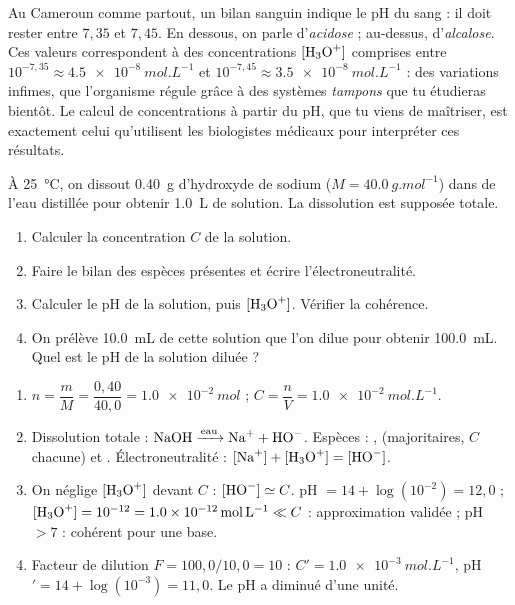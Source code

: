 \documentclass[11pt]{article}
\begin{document}
\begin{savaistu}
Au Cameroun comme partout, un bilan sanguin indique le pH du sang : il doit rester entre $7{,}35$ et $7{,}45$. En dessous, on parle d'\emph{acidose} ; au-dessus, d'\emph{alcalose}. Ces valeurs correspondent à des concentrations $[\ce{H3O+}]$ comprises entre $10^{-7{,}35} \approx \SI{4,5e-8}{mol.L^{-1}}$ et $10^{-7{,}45} \approx \SI{3,5e-8}{mol.L^{-1}}$ : des variations infimes, que l'organisme régule grâce à des systèmes \emph{tampons} que tu étudieras bientôt. Le calcul de concentrations à partir du pH, que tu viens de maîtriser, est exactement celui qu'utilisent les biologistes médicaux pour interpréter ces résultats.
\end{savaistu}

\begin{exercice}
À \SI{25}{\celsius}, on dissout \SI{0,40}{g} d'hydroxyde de sodium  ($M = \SI{40,0}{g.mol^{-1}}$) dans de l'eau distillée pour obtenir \SI{1,0}{L} de solution. La dissolution est supposée totale.
\begin{enumerate}
\item Calculer la concentration $C$ de la solution.
\item Faire le bilan des espèces présentes et écrire l'électroneutralité.
\item Calculer le pH de la solution, puis $[\ce{H3O+}]$. Vérifier la cohérence.
\item On prélève \SI{10,0}{mL} de cette solution que l'on dilue pour obtenir \SI{100,0}{mL}. Quel est le pH de la solution diluée ?
\end{enumerate}
\end{exercice}

\begin{corrige}
\begin{enumerate}
\item $n = \dfrac{m}{M} = \dfrac{0{,}40}{40{,}0} = \SI{1,0e-2}{mol}$ ; $C = \dfrac{n}{V} = \SI{1,0e-2}{mol.L^{-1}}$.
\item Dissolution totale : $\ce{NaOH ->[eau] Na+ + HO-}$. Espèces : ,  (majoritaires, $C$ chacune) et . Électroneutralité : $[\ce{Na+}] + [\ce{H3O+}] = [\ce{HO-}]$.
\item On néglige $[\ce{H3O+}]$ devant $C$ : $[\ce{HO-}] \simeq C$. pH $= 14 + \log(10^{-2}) = 12{,}0$ ; $[\ce{H3O+}] = 10^{-12} = \SI{1,0e-12}{mol.L^{-1}} \ll C$ : approximation validée ; pH $> 7$ : cohérent pour une base.
\item Facteur de dilution $F = 100{,}0/10{,}0 = 10$ : $C' = \SI{1,0e-3}{mol.L^{-1}}$, pH$' = 14 + \log(10^{-3}) = 11{,}0$. Le pH a diminué d'une unité.
\end{enumerate}
\end{corrige}
\end{document}
